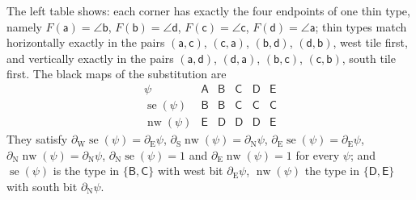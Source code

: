 The left table shows: each corner has exactly the four endpoints of one thin type, namely $F(\mathsf a)=\angle\mathsf b$, $F(\mathsf b)=\angle\mathsf d$, $F(\mathsf c)=\angle\mathsf c$, $F(\mathsf d)=\angle\mathsf a$; thin types match horizontally exactly in the pairs $(\mathsf a,\mathsf c)$, $(\mathsf c,\mathsf a)$, $(\mathsf b,\mathsf d)$, $(\mathsf d,\mathsf b)$, west tile first, and vertically exactly in the pairs $(\mathsf a,\mathsf d)$, $(\mathsf d,\mathsf a)$, $(\mathsf b,\mathsf c)$, $(\mathsf c,\mathsf b)$, south tile first. The black maps of the substitution are
\[
\begin{array}{c|ccccc}
\psi & \mathsf A&\mathsf B&\mathsf C&\mathsf D&\mathsf E\\\hline
\operatorname{se}(\psi)&\mathsf B&\mathsf B&\mathsf C&\mathsf C&\mathsf C\\
\operatorname{nw}(\psi)&\mathsf E&\mathsf D&\mathsf D&\mathsf D&\mathsf E
\end{array}
\]
They satisfy $\partial_{\mathrm W}\operatorname{se}(\psi)=\partial_{\mathrm E}\psi$, $\partial_{\mathrm S}\operatorname{nw}(\psi)=\partial_{\mathrm N}\psi$, $\partial_{\mathrm E}\operatorname{se}(\psi)=\partial_{\mathrm E}\psi$, $\partial_{\mathrm N}\operatorname{nw}(\psi)=\partial_{\mathrm N}\psi$, $\partial_{\mathrm N}\operatorname{se}(\psi)=1$ and $\partial_{\mathrm E}\operatorname{nw}(\psi)=1$ for every $\psi$; and $\operatorname{se}(\psi)$ is the type in $\{\mathsf B,\mathsf C\}$ with west bit $\partial_{\mathrm E}\psi$, $\operatorname{nw}(\psi)$ the type in $\{\mathsf D,\mathsf E\}$ with south bit $\partial_{\mathrm N}\psi$.


